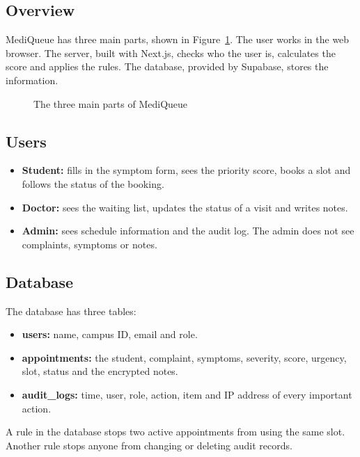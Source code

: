 \documentclass[12pt,a4paper]{article}
\begin{document}
\subsection{Overview}
MediQueue has three main parts, shown in Figure~\ref{fig:overview}. The user works in the web browser. The server, built with Next.js, checks who the user is, calculates the score and applies the rules. The database, provided by Supabase, stores the information.

\begin{figure}[htbp]
\centering
{}
\caption{The three main parts of MediQueue}
\label{fig:overview}
\end{figure}

\subsection{Users}
\begin{itemize}
  \item \textbf{Student:} fills in the symptom form, sees the priority score, books a slot and follows the status of the booking.
  \item \textbf{Doctor:} sees the waiting list, updates the status of a visit and writes notes.
  \item \textbf{Admin:} sees schedule information and the audit log. The admin does not see complaints, symptoms or notes.
\end{itemize}

\subsection{Database}
The database has three tables:
\begin{itemize}
  \item \textbf{users:} name, campus ID, email and role.
  \item \textbf{appointments:} the student, complaint, symptoms, severity, score, urgency, slot, status and the encrypted notes.
  \item \textbf{audit\_logs:} time, user, role, action, item and IP address of every important action.
\end{itemize}
A rule in the database stops two active appointments from using the same slot. Another rule stops anyone from changing or deleting audit records.
\end{document}
